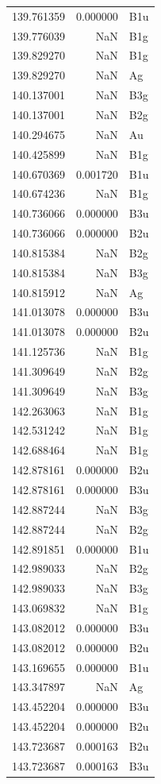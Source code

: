 \begin{longtable}{rrl}
139.761359 & 0.000000 & B1u \\
139.776039 & NaN & B1g \\
139.829270 & NaN & B1g \\
139.829270 & NaN & Ag \\
140.137001 & NaN & B3g \\
140.137001 & NaN & B2g \\
140.294675 & NaN & Au \\
140.425899 & NaN & B1g \\
140.670369 & 0.001720 & B1u \\
140.674236 & NaN & B1g \\
140.736066 & 0.000000 & B3u \\
140.736066 & 0.000000 & B2u \\
140.815384 & NaN & B2g \\
140.815384 & NaN & B3g \\
140.815912 & NaN & Ag \\
141.013078 & 0.000000 & B3u \\
141.013078 & 0.000000 & B2u \\
141.125736 & NaN & B1g \\
141.309649 & NaN & B2g \\
141.309649 & NaN & B3g \\
142.263063 & NaN & B1g \\
142.531242 & NaN & B1g \\
142.688464 & NaN & B1g \\
142.878161 & 0.000000 & B2u \\
142.878161 & 0.000000 & B3u \\
142.887244 & NaN & B3g \\
142.887244 & NaN & B2g \\
142.891851 & 0.000000 & B1u \\
142.989033 & NaN & B2g \\
142.989033 & NaN & B3g \\
143.069832 & NaN & B1g \\
143.082012 & 0.000000 & B3u \\
143.082012 & 0.000000 & B2u \\
143.169655 & 0.000000 & B1u \\
143.347897 & NaN & Ag \\
143.452204 & 0.000000 & B3u \\
143.452204 & 0.000000 & B2u \\
143.723687 & 0.000163 & B2u \\
143.723687 & 0.000163 & B3u \\

\end{longtable}
